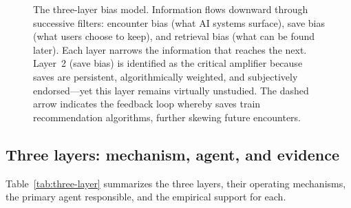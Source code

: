 \documentclass[12pt,a4paper]{article}
\begin{document}
\begin{figure}[htbp]
\caption{The three-layer bias model.
Information flows downward through successive filters: encounter bias (what AI systems surface), save bias (what users choose to keep), and retrieval bias (what can be found later).
Each layer narrows the information that reaches the next.
Layer~2 (save bias) is identified as the critical amplifier because saves are persistent, algorithmically weighted, and subjectively endorsed---yet this layer remains virtually unstudied.
The dashed arrow indicates the feedback loop whereby saves train recommendation algorithms, further skewing future encounters.}
\label{fig:three-layer}
\end{figure}


\subsection{Three layers: mechanism, agent, and evidence}

Table~\ref{tab:three-layer} summarizes the three layers, their operating mechanisms, the primary agent responsible, and the empirical support for each.
\end{document}
